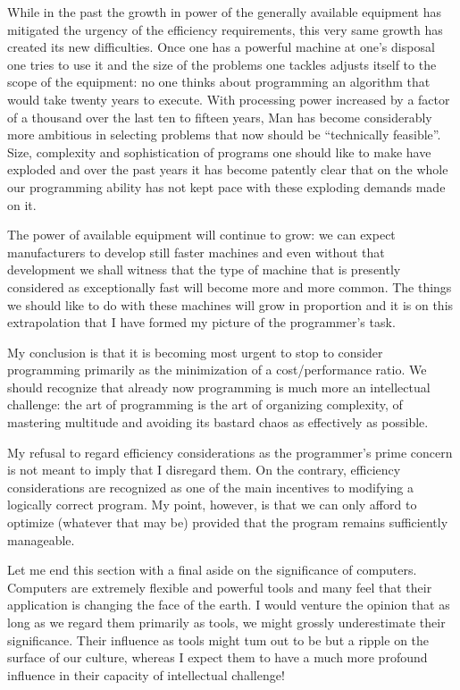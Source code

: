 While in the past the growth in power of the generally available equipment has mitigated the urgency of the efficiency requirements, this very same growth has created its new difficulties. Once one has a powerful machine at one's disposal one tries to use it and the size of the problems one tackles adjusts itself to the scope of the equipment: no one thinks about programming an algorithm that would take twenty years to execute. With processing power increased by a factor of a thousand over the last ten to fifteen years, Man has become considerably more ambitious in selecting problems that now should be ``technically feasible''. Size, complexity and sophistication of programs one should like to make have exploded and over the past years it has become patently clear that on the whole our programming ability has not kept pace with these exploding demands made on it.

The power of available equipment will continue to grow: we can expect manufacturers to develop still faster machines and even without that development we shall witness that the type of machine that is presently considered as exceptionally fast will become more and more common. The things we should like to do with these machines will grow in proportion and it is on this extrapolation that I have formed my picture of the programmer's task.

My conclusion is that it is becoming most urgent to stop to consider programming primarily as the minimization of a cost/performance ratio. We
should recognize that already now programming is much more an intellectual challenge: the art of programming is the art of organizing complexity, of mastering multitude and avoiding its bastard chaos as effectively as possible.

My refusal to regard efficiency considerations as the programmer's prime concern is not meant to imply that I disregard them. On the contrary,
efficiency considerations are recognized as one of the main incentives to modifying a logically correct program. My point, however, is that we can
only afford to optimize (whatever that may be) provided that the program remains sufficiently manageable.

Let me end this section with a final aside on the significance of computers. Computers are extremely flexible and powerful tools and many feel that their application is changing the face of the earth. I would venture the opinion that as long as we regard them primarily as tools, we might grossly underestimate their significance. Their influence as tools might tum out to be but a ripple on the surface of our culture, whereas I expect them to have a much more profound influence in their capacity of intellectual challenge!
\medskip


